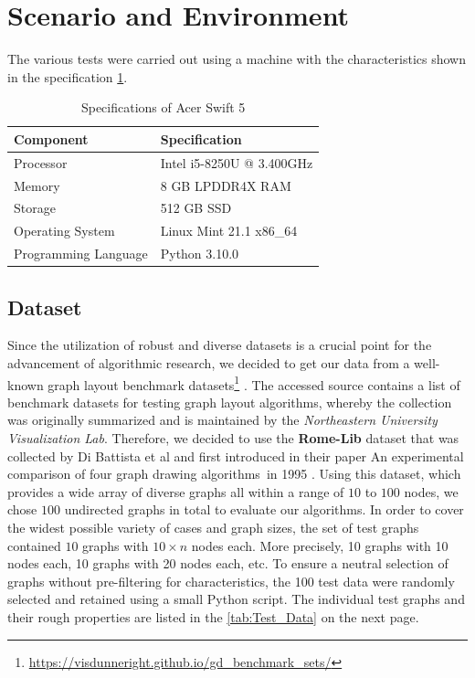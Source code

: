 \documentclass[bachelor, english]{algothesis}
\begin{document}
\section{Scenario and Environment}
The various tests were carried out using a machine with the characteristics shown in the specification \cref{tab:specs}.

\begin{table}[h]
\centering
\begin{tabular}{|l|l|}
\hline
\textbf{Component}      & \textbf{Specification} \\ \hline
Processor       & Intel i5-8250U @ 3.400GHz      \\ \hline
Memory          & 8 GB LPDDR4X RAM               \\ \hline
Storage         & 512 GB SSD                     \\ \hline
Operating System & Linux Mint 21.1 x86\_64        \\ \hline
Programming Language & Python 3.10.0       \\ \hline
\end{tabular}
\caption{Specifications of Acer Swift 5}
\label{tab:specs}
\end{table}

\subsection{Dataset}
Since the utilization of robust and diverse datasets is a crucial point for the advancement of algorithmic research, we decided to get our data from a well-known graph layout benchmark datasets\footnote{\url{https://visdunneright.github.io/gd_benchmark_sets/}} \cite{Benchmark}. The accessed source contains a list of benchmark datasets for testing graph layout algorithms, whereby the collection was originally summarized and is maintained by the \textit{Northeastern University Visualization Lab}. Therefore, we decided to use the \textbf{Rome-Lib} dataset that was collected by Di Battista et al and first introduced in their paper \glqq An experimental comparison of four graph drawing algorithms\grqq \, in 1995 \cite{Rome_Lib}. 
\newline
Using this dataset, which provides a wide array of diverse graphs all within a range of $10$ to $100$ nodes, we chose $100$ undirected graphs in total to evaluate our algorithms. In order to cover the widest possible variety of cases and graph sizes, the set of test graphs contained $10$ graphs with $10\times n$ nodes each. More precisely, 10 graphs with 10 nodes each, 10 graphs with 20 nodes each, etc. To ensure a neutral selection of graphs without pre-filtering for characteristics, the 100 test data were randomly selected and retained using a small Python script. The individual test graphs and their rough properties are listed in the \cref{tab:Test_Data} on the next page.
\newline
\end{document}
